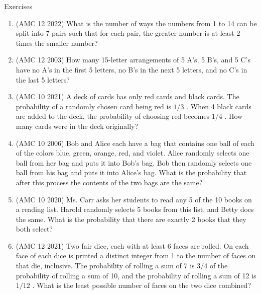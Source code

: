 \begin{xcb}{Exercises}
\begin{enumerate}
\item (AMC 12 2022)  What is the number of ways the numbers from 1 to 14 can be split into 7 pairs such that for each pair, the greater number is at least 2 times the smaller number?
\begin{hint}
\end{hint}
\item(AMC 12 2003)  How many 15-letter arrangements of 5 A’s, 5 B’s, and 5 C’s have no A’s in the first 5 letters, no B’s in the next 5 letters, and no C’s in the last 5 letters?
\begin{hint}
\end{hint}
\item(AMC 10 2021)  A deck of cards has only red cards and black cards. The probability of a randomly chosen card being red is $1/3$ . When 4 black cards are added to the deck, the probability of choosing red becomes $1/4$ . How many cards were in the deck originally?
\item(AMC 10 2006)  Bob and Alice each have a bag that contains one ball of each of the colors blue, green, orange, red, and violet. Alice randomly selects one ball from her bag and puts it into Bob’s bag. Bob then randomly selects one ball from his bag and puts it into Alice’s bag. What is the probability that after this process the contents of the two bags are the same?
\item(AMC 10 2020)  Ms. Carr asks her students to read any 5 of the 10 books on a reading list. Harold randomly selects 5 books from this list, and Betty does the same. What is the probability that there are exactly 2 books that they both select?
\begin{hint}
\end{hint}
\item (AMC 12 2021)  Two fair dice, each with at least 6 faces are rolled. On each face of each dice is printed a distinct integer from 1 to the number of faces on that die, inclusive. The probability of rolling a sum of 7 is $3/4$ of the probability of rolling a sum of 10, and the probability of rolling a sum of 12 is $1/12$ . What is the least possible number of faces on the two dice combined?

\end{enumerate}
\end{xcb}
